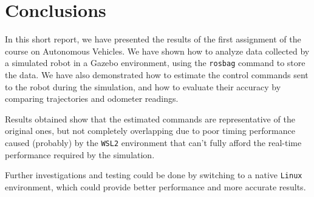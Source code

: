 \section{Conclusions}
\label{sec:conclusions}

In this short report, we have presented the results of the first assignment of the course on Autonomous Vehicles.
We have shown how to analyze data collected by a simulated robot in a Gazebo environment, using the \texttt{rosbag} command to store the data.
We have also demonstrated how to estimate the control commands sent to the robot during the simulation, and how to evaluate their accuracy by comparing trajectories and odometer readings.

Results obtained show that the estimated commands are representative of the original ones, but not completely overlapping due to poor timing performance caused (probably) by the \texttt{WSL2} environment that can't fully afford the real-time performance required by the simulation.

Further investigations and testing could be done by switching to a native \texttt{Linux} environment, which could provide better performance and more accurate results.